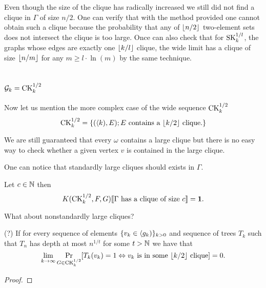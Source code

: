 Even though the size of the clique has radically increased we still did not find a clique in $\Gamma$ of size $n/2$. One can verify that with the method provided one cannot obtain such a clique because the probability that any of $\left \lfloor {n/2} \right \rfloor$ two-element sets does not intersect the clique is too large. Once can also check that for $\text{SK}_{k}^{1/l}$, the graphs whose edges are exactly one $\left \lfloor {k/l} \right \rfloor$ clique, the wide limit has a clique of size $\left \lfloor {n/m} \right \rfloor$ for any $m\geq l\cdot \ln(m)$ by the same technique.

\section{$\mathcal{G}_k=\text{CK}_k^{1/2}$}

Now let us mention the more complex case of the wide sequence $\text{CK}_k^{1/2}$
\[\text{CK}_k^{1/2}=\{(\langle k),E);E\text{ contains a $\left \lfloor {k/2} \right \rfloor$ clique.}\}\]

We are still guaranteed that every $\omega$ contains a large clique but there is no easy way to check whether a given vertex $v$ is contained in the large clique. 

One can notice that standardly large cliques should exists in $\Gamma$.

\begin{conj}
Let $c\in\mathbb{N}$ then 
\[K(\text{CK}_k^{1/2},F,G)\llbracket\text{$\Gamma$ has a clique of size $c$}\rrbracket=\textbf{1}.\]
\end{conj}

What about nonstandardly large cliques?

\begin{thrm}(?)
If for every sequence of elements $\{v_k\in \langle g_k)\}_{k>0}$ and sequence of trees $T_k$ such that $T_n$ has depth at most $n^{1/t}$ for some $t>\mathbb{N}$ we have that
\[\lim_{k\to\infty} \Pr_{G\in \text{CK}_k^{1/2}}[T_k(v_k)=1\Leftrightarrow \text{$v_k$ is in some $\left \lfloor {k/2} \right \rfloor$ clique}]=0.\]
\end{thrm}
\begin{proof}
\end{proof}

